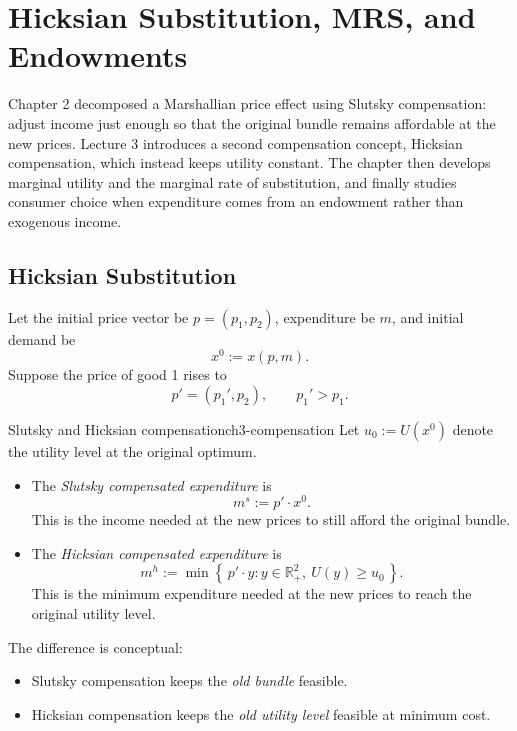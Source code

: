 

\section{Hicksian Substitution, MRS, and Endowments}

Chapter 2 decomposed a Marshallian price effect using Slutsky compensation: adjust income just enough so that the original bundle remains affordable at the new prices. Lecture 3 introduces a second compensation concept, Hicksian compensation, which instead keeps utility constant. The chapter then develops marginal utility and the marginal rate of substitution, and finally studies consumer choice when expenditure comes from an endowment rather than exogenous income.

\subsection{Hicksian Substitution}

Let the initial price vector be $p=(p_1,p_2)$, expenditure be $m$, and initial demand be
\[
x^0 := x(p,m).
\]
Suppose the price of good 1 rises to
\[
p'=(p_1',p_2), \qquad p_1' > p_1.
\]

\begin{definition}{Slutsky and Hicksian compensation}{ch3-compensation}
Let $u_0 := U(x^0)$ denote the utility level at the original optimum.

\begin{itemize}
    \item The \emph{Slutsky compensated expenditure} is
    \[
    m^s := p' \cdot x^0.
    \]
    This is the income needed at the new prices to still afford the original bundle.
    \item The \emph{Hicksian compensated expenditure} is
    \[
    m^h := \min \left\{\, p' \cdot y : y \in \mathbb{R}_+^2,\ U(y) \ge u_0 \,\right\}.
    \]
    This is the minimum expenditure needed at the new prices to reach the original utility level.
\end{itemize}
\end{definition}

The difference is conceptual:
\begin{itemize}
    \item Slutsky compensation keeps the \emph{old bundle} feasible.
    \item Hicksian compensation keeps the \emph{old utility level} feasible at minimum cost.
\end{itemize}

